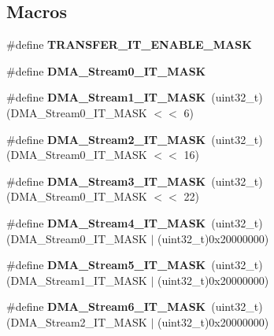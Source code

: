 \subsection*{Macros}
\begin{DoxyCompactItemize}
\item 
\#define {\bfseries T\-R\-A\-N\-S\-F\-E\-R\-\_\-\-I\-T\-\_\-\-E\-N\-A\-B\-L\-E\-\_\-\-M\-A\-S\-K}
\item 
\#define {\bfseries D\-M\-A\-\_\-\-Stream0\-\_\-\-I\-T\-\_\-\-M\-A\-S\-K}
\item 
\hypertarget{group___d_m_a_ga145798f7c0cffc0effe3b6588f7a5812}{\#define {\bfseries D\-M\-A\-\_\-\-Stream1\-\_\-\-I\-T\-\_\-\-M\-A\-S\-K}~(uint32\-\_\-t)(D\-M\-A\-\_\-\-Stream0\-\_\-\-I\-T\-\_\-\-M\-A\-S\-K $<$$<$ 6)}\label{group___d_m_a_ga145798f7c0cffc0effe3b6588f7a5812}

\item 
\hypertarget{group___d_m_a_gab7e71eaed70613ad592acfb37eb37777}{\#define {\bfseries D\-M\-A\-\_\-\-Stream2\-\_\-\-I\-T\-\_\-\-M\-A\-S\-K}~(uint32\-\_\-t)(D\-M\-A\-\_\-\-Stream0\-\_\-\-I\-T\-\_\-\-M\-A\-S\-K $<$$<$ 16)}\label{group___d_m_a_gab7e71eaed70613ad592acfb37eb37777}

\item 
\hypertarget{group___d_m_a_ga83a5c838038ce61242f8beaf8d9fff43}{\#define {\bfseries D\-M\-A\-\_\-\-Stream3\-\_\-\-I\-T\-\_\-\-M\-A\-S\-K}~(uint32\-\_\-t)(D\-M\-A\-\_\-\-Stream0\-\_\-\-I\-T\-\_\-\-M\-A\-S\-K $<$$<$ 22)}\label{group___d_m_a_ga83a5c838038ce61242f8beaf8d9fff43}

\item 
\hypertarget{group___d_m_a_ga55d28ead27e0af7d17db2b749695abe2}{\#define {\bfseries D\-M\-A\-\_\-\-Stream4\-\_\-\-I\-T\-\_\-\-M\-A\-S\-K}~(uint32\-\_\-t)(D\-M\-A\-\_\-\-Stream0\-\_\-\-I\-T\-\_\-\-M\-A\-S\-K $|$ (uint32\-\_\-t)0x20000000)}\label{group___d_m_a_ga55d28ead27e0af7d17db2b749695abe2}

\item 
\hypertarget{group___d_m_a_gaceb30b7dcde1275d843ea932a00f44d7}{\#define {\bfseries D\-M\-A\-\_\-\-Stream5\-\_\-\-I\-T\-\_\-\-M\-A\-S\-K}~(uint32\-\_\-t)(D\-M\-A\-\_\-\-Stream1\-\_\-\-I\-T\-\_\-\-M\-A\-S\-K $|$ (uint32\-\_\-t)0x20000000)}\label{group___d_m_a_gaceb30b7dcde1275d843ea932a00f44d7}

\item 
\hypertarget{group___d_m_a_ga085aa754247e62f4b95111ea4ebf4f6f}{\#define {\bfseries D\-M\-A\-\_\-\-Stream6\-\_\-\-I\-T\-\_\-\-M\-A\-S\-K}~(uint32\-\_\-t)(D\-M\-A\-\_\-\-Stream2\-\_\-\-I\-T\-\_\-\-M\-A\-S\-K $|$ (uint32\-\_\-t)0x20000000)}\label{group___d_m_a_ga085aa754247e62f4b95111ea4ebf4f6f}


\end{DoxyCompactItemize}
